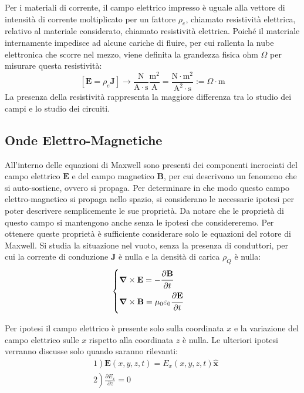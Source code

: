 \documentclass{article}
\newcommand{\vect}[1]{\boldsymbol{\mathbf{#1}}}
\newcommand{\SI}[1]{\mathrm{#1}}
\numberwithin{equation}{subsection}
\begin{document}
Per i materiali di corrente, il campo elettrico impresso è uguale alla vettore di intensità di corrente moltiplicato per un fattore $\rho_e$, chiamato resistività elettrica, 
relativo al materiale considerato, chiamato resistività elettrica. Poiché il materiale internamente impedisce ad alcune cariche di fluire, per cui rallenta la nube elettronica 
che scorre nel mezzo, viene definita la grandezza fisica ohm $\Omega$ per misurare questa resistività:
\begin{equation*}
    \displaystyle\left[\vect{E}=\rho_{e}\vect{J}\right]\to\frac{\SI{N}}{\SI{A}\cdot \SI{s}}\frac{\SI{m}^2}{\SI{A}}=\frac{\SI{N}\cdot \SI{m}^2}{\SI{A}^2\cdot \SI{s}}:=\Omega\cdot\SI{m}
\end{equation*}
La presenza della resistività rappresenta la maggiore differenza tra lo studio dei campi e lo studio dei circuiti.  

\subsection{Onde Elettro-Magnetiche}
All'interno delle equazioni di Maxwell sono presenti dei componenti incrociati del campo elettrico $\vect{E}$ e del campo magnetico $\vect{B}$, per cui descrivono un fenomeno 
che si auto-sostiene, ovvero si propaga. Per determinare in che modo questo campo elettro-magnetico si propaga nello spazio, si considerano le necessarie ipotesi per poter 
descrivere semplicemente le sue proprietà. Da notare che le proprietà di questo campo si mantengono anche senza le ipotesi che considereremo. Per ottenere queste proprietà 
è sufficiente considerare solo le equazioni del rotore di Maxwell. Si studia la situazione nel vuoto, senza la presenza di conduttori, per cui la corrente di conduzione $\vect{J}$ 
è nulla e la densità di carica $\rho_Q$ è nulla: 
\begin{equation*}
    \begin{cases}
        \vect\nabla\times\vect{E}=-\displaystyle\frac{\strut \partial \vect{B}}{\strut \partial t}\\
        \vect\nabla\times\vect{B}=\mu_0\varepsilon_0\displaystyle\frac{\strut \partial \vect{E}}{\strut \partial t}
    \end{cases}
\end{equation*}

Per ipotesi il campo elettrico è presente solo sulla coordinata $x$ e la variazione del campo elettrico sulle $x$ rispetto alla coordinata $z$ è nulla. Le ulteriori ipotesi 
verranno discusse solo quando saranno rilevanti:
\begin{align*}
    &1\left.\right)\vect{E}(x,y,z,t)=E_x(x,y,z,t)\hat{\vect{x}}\\
    &2\left.\right)\displaystyle\frac{\partial E_x}{\partial z}=0
\end{align*}
\end{document}
